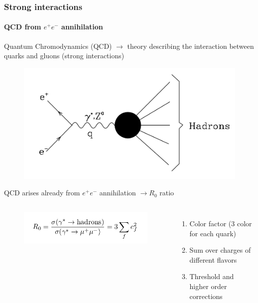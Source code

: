 \documentclass[aspectratio=43]{beamer}
\begin{document}
\begin{frame}

	\frametitle{Strong interactions}
	\framesubtitle{QCD from $e^{+}e^{-}$ annihilation}

	Quantum Chromodynamics (QCD) $\rightarrow$ theory describing the interaction between quarks and gluons (strong interactions)
	\begin{figure}
		\includegraphics[width = 5 cm]{plots/ee_hadrons.png}
	\end{figure}
 
	QCD arises already from $e^{+}e^{-}$ annihilation $\rightarrow R_{0}$ ratio

	\begin{columns}
	
	
		\begin{figure}
			\includegraphics[width = 6 cm]{plots/eq_R0.png}
		\end{figure}
	
	
		\begin{enumerate}
			\item \footnotesize Color factor (3 color for each quark)
			\item \footnotesize Sum over charges of different flavors
			\item \footnotesize Threshold and higher order corrections
		\end{enumerate}	

	\end{columns}

\end{frame}
\end{document}

